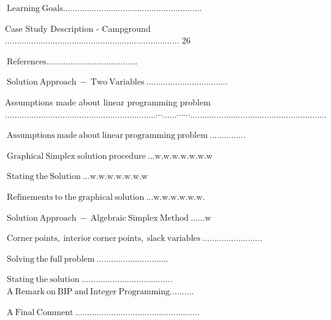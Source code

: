\documentclass[10pt]{article}
\begin{document}
$\mathrm{~ L e a r n i n g ~ G o a l s . . . . . . . . . . . . . . . . . . . . . . . . . . . . . . . . . . . . . . . . . . . . . . . . . . . . . . . . . .}$

Case Study Description - Campground ......................................................................... 26

$\mathrm{~ R e f e r e n c e s . . . . . . . . . . . . . . . . . . . . . . . . . . . . . . . . . . . . . .}$

$\mathrm{~ S o l u t i o n ~ A p p r o a c h ~ - ~ T w o ~ V a r i a b l e s ~ . . . . . . . . . . . . . . . . . . . . . . . . . . . . . . . . . .}$

Assumptions made about linear programming problem $\ldots \ldots \ldots \ldots \ldots \ldots \ldots \ldots \ldots \ldots \ldots \ldots \ldots \ldots \ldots \ldots \ldots \ldots \ldots \ldots \ldots \cdots \ldots \ldots \cdots \cdots \ldots \ldots \ldots \ldots \ldots \ldots \ldots \ldots \ldots \ldots \ldots \ldots \ldots \ldots \ldots \ldots \ldots \ldots \ldots$

$\mathrm{~ A s s u m p t i o n s ~ m a d e ~ a b o u t ~ l i n e a r ~ p r o g r a m m i n g ~ p r o b l e m ~ . . . . . . . . . . . . . . .}$

$\mathrm{~ G r a p h i c a l ~ S i m p l e x ~ s o l u t i o n ~ p r o c e d u r e ~ . . . w . w . w . w . w . w . w}$

$\mathrm{~ S t a t i n g ~ t h e ~ S o l u t i o n ~ . . . w . w . w . w . w . w . w}$

$\mathrm{~ R e f i n e m e n t s ~ t o ~ t h e ~ g r a p h i c a l ~ s o l u t i o n ~ . . . w . w . w . w . w . w .}$

$\mathrm{~ S o l u t i o n ~ A p p r o a c h ~ - ~ A l g e b r a i c ~ S i m p l e x ~ M e t h o d ~ . . . . . . w}$

$\mathrm{~ C o r n e r ~ p o i n t s , ~ i n t e r i o r ~ c o r n e r ~ p o i n t s , ~ s l a c k ~ v a r i a b l e s ~ . . . . . . . . . . . . . . . . . . . . . . . . .}$

$\mathrm{~ S o l v i n g ~ t h e ~ f u l l ~ p r o b l e m ~ . . . . . . . . . . . . . . . . . . . . . . . . . . . . . .}$

$\mathrm{~ S t a t i n g ~ t h e ~ s o l u t i o n ~ . . . . . . . . . . . . . . . . . . . . . . . . . . . . . . . . . . . . . .}$ $\mathrm{~ A ~ R e m a r k ~ o n ~ B I P ~ a n d ~ I n t e g e r ~ P r o g r a m m i n g . . . . . . . . . .}$

$\mathrm{~ A ~ F i n a l ~ C o m m e n t ~ . . . . . . . . . . . . . . . . . . . . . . . . . . . . . . . . . . . . . . . . . . . . . . . . . . . .}$
\end{document}
